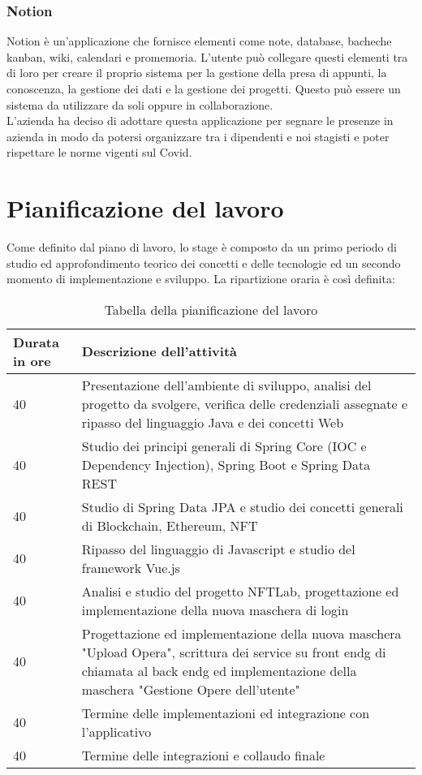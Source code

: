 \subsubsection{Notion}
Notion è un'applicazione che fornisce elementi come note, database, bacheche kanban, wiki, calendari e promemoria. L'utente può collegare questi elementi tra di loro per creare il proprio sistema per la gestione della presa di appunti, la conoscenza, la gestione dei dati e la gestione dei progetti. Questo può essere un sistema da utilizzare da soli oppure in collaborazione.\\
L'azienda ha deciso di adottare questa applicazione per segnare le presenze in azienda in modo da potersi organizzare tra i dipendenti e noi stagisti e poter rispettare le norme vigenti sul Covid.

\section{Pianificazione del lavoro}
Come definito dal piano di lavoro, lo stage è composto da un primo periodo di studio ed approfondimento teorico dei concetti e delle tecnologie ed un secondo momento di implementazione e sviluppo. La ripartizione oraria è così definita:
\begin{table}[H]
	\caption{Tabella della pianificazione del lavoro}
	\label{tab:pianificazione-del-lavoro}
	\renewcommand{\arraystretch}{1.6}
	\begin{tabularx}{\textwidth}{lX}
		\hline
		\textbf{Durata in ore} & \textbf{Descrizione dell'attività}\\
		\hline
		40 & Presentazione dell'ambiente di sviluppo, analisi del progetto da svolgere, verifica delle credenziali assegnate e ripasso del linguaggio Java e dei concetti Web\\
		\hline
		40 & Studio dei principi generali di Spring Core (IOC e Dependency Injection), Spring Boot e Spring Data REST \\
		\hline
		40 & Studio di Spring Data JPA e studio dei concetti generali di Blockchain, Ethereum, NFT\\
		\hline
		40 & Ripasso del linguaggio di Javascript e studio del framework Vue.js\\
		\hline
		40 & Analisi e studio del progetto NFTLab, progettazione ed implementazione della nuova maschera di login\\
		\hline
		40 & Progettazione ed implementazione della nuova maschera "Upload Opera", scrittura dei service su \gls{front endg} di chiamata al \gls{back endg} ed implementazione della maschera "Gestione Opere dell'utente"\\
		\hline
		40 & Termine delle implementazioni ed integrazione con l'applicativo\\
		\hline
		40 & Termine delle integrazioni e collaudo finale\\
		\hline
	\end{tabularx}
\end{table}%

